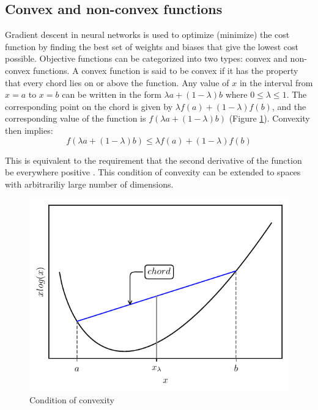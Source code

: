 \subsection{Convex and non-convex functions}
Gradient descent in neural networks is used to optimize (minimize) the cost function by finding the best set of weights and biases that give the lowest cost possible. Objective functions can be categorized into two types: convex and non-convex functions.
A convex function is said to be convex if it has the property that every chord lies on or above the function. Any value of $x$ in the interval from $x=a$ to $x=b$ can be written in the form $\lambda a+(1-\lambda)b$ where $0\leq\lambda\leq 1$. The corresponding point on the chord is given by $\lambda f(a)+(1-\lambda)f(b)$, and the corresponding value of the function is $f(\lambda a+(1-\lambda)b)$ (Figure \ref{fig:convexity}). Convexity then implies:
\begin{equation}
    f(\lambda a+(1-\lambda)b)\leq \lambda f(a)+(1-\lambda)f(b)
    \label{equation:convexity}
\end{equation}

This is equivalent to the requirement that the second derivative of the function be everywhere positive \cite{Bishop2006}. This condition of convexity can be extended to spaces with arbitrariliy large number of dimensions.

\begin{figure}[h]
    \centering
    \includegraphics{figures/convex_function.pdf}
    \caption{Condition of convexity}
    \label{fig:convexity}
\end{figure}

